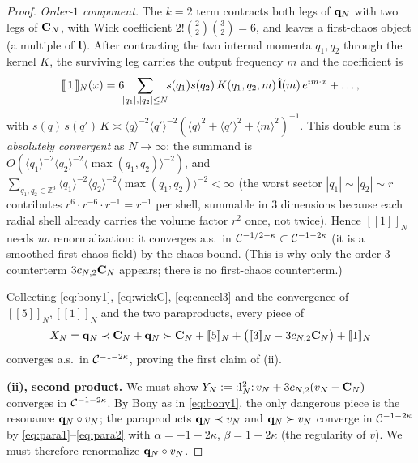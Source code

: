 \begin{proof}
\emph{Order-$1$ component.} The $k=2$ term contracts both legs of $\mathbf{q}_N$ with
two legs of $\mathbf{C}_N$, with Wick coefficient $2!\binom{2}{2}\binom{3}{2}=6$, and
leaves a first-chaos object (a multiple of $\mathbf{l}$). After contracting the two
internal momenta $q_1,q_2$ through the kernel $K$, the surviving leg carries the
output frequency $m$ and the coefficient is
\[
[\![\,1\,]\!]_N(x)=6\!\!\sum_{|q_1|,|q_2|\le N}\!\!s(q_1)s(q_2)\,K(q_1,q_2,m)\,\hat{\mathbf{l}}(m)\,e^{im\cdot x}+\dots,
\]
with $s(q)\,s(q')\,K\asymp\langle q\rangle^{-2}\langle q'\rangle^{-2}(\langle q\rangle^2+\langle q'\rangle^2+\langle m\rangle^2)^{-1}$.
This double sum is \emph{absolutely convergent} as $N\to\infty$: the summand is
$O(\langle q_1\rangle^{-2}\langle q_2\rangle^{-2}\langle\max(q_1,q_2)\rangle^{-2})$,
and $\sum_{q_1,q_2\in\mathbb Z^3}\langle q_1\rangle^{-2}\langle q_2\rangle^{-2}\langle\max(q_1,q_2)\rangle^{-2}<\infty$
(the worst sector $|q_1|\sim|q_2|\sim r$ contributes $r^{6}\cdot r^{-6}\cdot r^{-1}=r^{-1}$ per shell,
summable in $3$ dimensions because each radial shell already carries the volume
factor $r^{2}$ once, not twice). Hence $[\![1]\!]_N$ needs \emph{no}
renormalization: it converges a.s.\ in $\mathcal{C}^{-1/2-\kappa}\subset\mathcal{C}^{-1-2\kappa}$
(it is a smoothed first-chaos field) by the chaos bound. (This is why only the
order-$3$ counterterm $3c_{N,2}\mathbf{C}_N$ appears; there is no first-chaos
counterterm.)

Collecting \eqref{eq:bony1}, \eqref{eq:wickC}, \eqref{eq:cancel3} and the
convergence of $[\![5]\!]_N,[\![1]\!]_N$ and the two paraproducts, every piece of
\[
X_N=\mathbf{q}_N\prec\mathbf{C}_N+\mathbf{q}_N\succ\mathbf{C}_N+[\![5]\!]_N+\bigl([\![3]\!]_N-3c_{N,2}\mathbf{C}_N\bigr)+[\![1]\!]_N
\]
converges a.s.\ in $\mathcal{C}^{-1-2\kappa}$, proving the first claim of (ii).

\medskip
\textbf{(ii), second product.} We must show
$Y_N:={:}\mathbf{l}_N^2{:}\,v_N+3c_{N,2}(v_N-\mathbf{C}_N)$ converges in $\mathcal{C}^{-1-2\kappa}$.
By Bony as in \eqref{eq:bony1}, the only dangerous piece is the resonance
$\mathbf{q}_N\circ v_N$; the paraproducts $\mathbf{q}_N\prec v_N$ and $\mathbf{q}_N\succ v_N$
converge in $\mathcal{C}^{-1-2\kappa}$ by \eqref{eq:para1}--\eqref{eq:para2} with
$\alpha=-1-2\kappa$, $\beta=1-2\kappa$ (the regularity of $v$). We must therefore
renormalize $\mathbf{q}_N\circ v_N$.


\end{proof}
